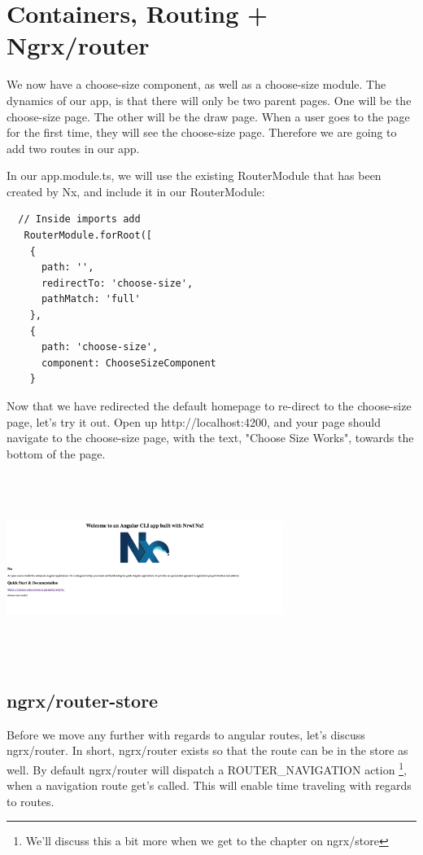 
\chapter{ Containers, Routing + Ngrx/router }

We now have a choose-size component, as well as a choose-size module.
The dynamics of our app, is that there will only be two parent pages. One will
be the choose-size page. The other will be the draw page. When a user goes to
the page for the first time, they will see the choose-size page. Therefore we
are going to add two routes in our app.

In our app.module.ts, we will use the existing RouterModule that has been
created by Nx, and include it in our RouterModule:

\begin{verbatim}
  // Inside imports add
   RouterModule.forRoot([
    {
      path: '',
      redirectTo: 'choose-size',
      pathMatch: 'full'
    },
    {
      path: 'choose-size',
      component: ChooseSizeComponent
    }
\end{verbatim}

Now that we have redirected the default homepage to re-direct to the
choose-size page, let's try it out. Open up http://localhost:4200, and your page
should navigate to the choose-size page, with the text, "Choose Size Works",
towards the bottom of the page.

\includegraphics[width=9cm, height=6.1cm]{routing/containers-and-routing/choose-size-screenshot}

\section{ ngrx/router-store }

Before we move any further with regards to angular routes, let's discuss
ngrx/router. In short, ngrx/router exists so that the route can be in the store
as well. By default ngrx/router will dispatch a ROUTER\_NAVIGATION action
\footnote{We'll discuss this a bit more when we get to the chapter on ngrx/store},
when a navigation route get's called. This will enable time traveling with
regards to routes.

